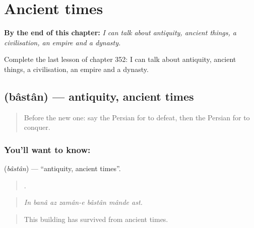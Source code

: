 
\chapter{Ancient times}
\label{ch:fa-ancient-times}

\begin{chapteropening}
\textbf{By the end of this chapter:} \emph{I can talk about antiquity, ancient things, a civilisation, an empire and a dynasty.}

Complete the last lesson of chapter 352: I can talk about antiquity, ancient things, a civilisation, an empire and a dynasty.
\end{chapteropening}

\section[\texorpdfstring{\fa{باستان} (bâstân)}{باستان (bâstân)}]{ (bâstân) — antiquity, ancient times}

\label{lesson:FA-C352-bastan}



\begin{quote}
Before the new one: say the Persian for to defeat, then the Persian for to conquer.
\end{quote}

\subsection*{You'll want to know: }
\textbf{} (\emph{bâstân}) — \textquotedblleft{}antiquity, ancient times\textquotedblright{}.

\begin{quote}
      .
\end{quote}

\begin{quote}
\emph{In banâ az zamân-e bâstân mânde ast.}
\end{quote}

\begin{quote}
This building has survived from ancient times.
\end{quote}

